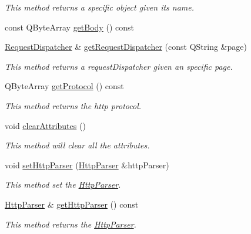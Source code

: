 \begin{DoxyCompactItemize}
\begin{DoxyCompactList}\small\item\em This method returns a specific object given its name. \end{DoxyCompactList}\item 
const Q\+Byte\+Array \hyperlink{class_c_w_f_1_1_http_servlet_request_a9b46d51ca2410ec587f980fc86d75027}{get\+Body} () const 
\item 
\hyperlink{class_c_w_f_1_1_request_dispatcher}{Request\+Dispatcher} \& \hyperlink{class_c_w_f_1_1_http_servlet_request_a0ce93d793a178c7e0e5fef4044b48bdc}{get\+Request\+Dispatcher} (const Q\+String \&page)
\begin{DoxyCompactList}\small\item\em This method returns a request\+Dispatcher given an specific page. \end{DoxyCompactList}\item 
Q\+Byte\+Array \hyperlink{class_c_w_f_1_1_http_servlet_request_a487fd95aa9c7f64cfa438097a59a30ca}{get\+Protocol} () const 
\begin{DoxyCompactList}\small\item\em This method returns the http protocol. \end{DoxyCompactList}\item 
void \hyperlink{class_c_w_f_1_1_http_servlet_request_a1e17ba223b17b4b390c9a351d4fff78e}{clear\+Attributes} ()
\begin{DoxyCompactList}\small\item\em This method will clear all the attributes. \end{DoxyCompactList}\item 
void \hyperlink{class_c_w_f_1_1_http_servlet_request_a0c28aa6bbd0cf10b482098c70fe2c0fd}{set\+Http\+Parser} (\hyperlink{class_c_w_f_1_1_http_parser}{Http\+Parser} \&http\+Parser)
\begin{DoxyCompactList}\small\item\em This method set the \hyperlink{class_c_w_f_1_1_http_parser}{Http\+Parser}. \end{DoxyCompactList}\item 
\hyperlink{class_c_w_f_1_1_http_parser}{Http\+Parser} \& \hyperlink{class_c_w_f_1_1_http_servlet_request_a3bb5c268aecca784c632c673078b4150}{get\+Http\+Parser} () const 
\begin{DoxyCompactList}\small\item\em This method returns the \hyperlink{class_c_w_f_1_1_http_parser}{Http\+Parser}. \end{DoxyCompactList}\item 

\end{DoxyCompactItemize}
